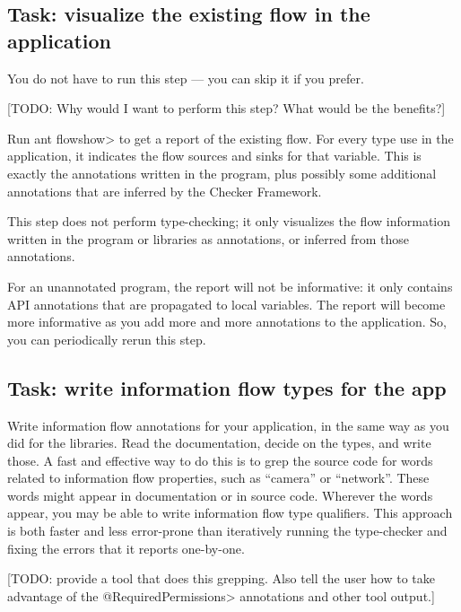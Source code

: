 \subsection{Task: visualize the existing flow in the application}

You do not have to run this step --- you can skip it if you
prefer.

[TODO:  Why would I want to perform this step?  What would be the benefits?]

Run \<ant flowshow> to get a report of the
existing flow.
For every type use in the application, it indicates the flow sources
and sinks for that variable. This is exactly the annotations written
in the program, plus possibly some additional annotations that are
inferred by the Checker Framework.


This step does not perform type-checking; it only visualizes the flow
information written in the program or libraries as annotations, or
inferred from those annotations.


For an unannotated program, the report will not be informative: it
only contains API annotations that are propagated to local
variables. The report will become more informative as you add more and
more annotations to the application. So, you can periodically rerun
this step. 


\subsection{Task: write information flow types for the app\label{flow-task-annotate-app}}

Write information flow annotations for your application, in the same way as
you did for the libraries.  Read the documentation, decide on the types,
and write those.  A fast and effective way to do this is to grep the source
code for words related to information flow properties, such as ``camera''
or ``network''.  These words might appear in documentation or in source
code.  Wherever the words appear, you may be able to write information flow
type qualifiers.  This approach is both faster and less error-prone than
iteratively running the type-checker and fixing the errors that it reports
one-by-one.

[TODO: provide a tool that does this grepping.  Also tell the user how to
take advantage of the \<@RequiredPermissions> annotations and other tool
output.]


